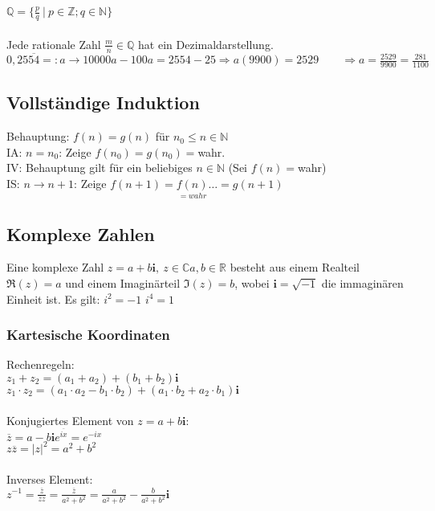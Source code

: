 \documentclass[6pt,a4paper]{scrartcl}
\begin{document}
\begin{multicols}{4}
$\mathbb Q=\{\frac{p}{q}\ \vert\ p\in\mathbb Z; q\in\mathbb N\}$\\
\\
Jede rationale Zahl $\frac m n \in \mathbb Q$ hat ein Dezimaldarstellung.\\
$0,25\overline{54} =: a \rightarrow 10000a - 100a = 2554 -25 \Rightarrow a(9900) = 2529 \qquad \Rightarrow a = \frac{2529}{9900} = \frac{281}{1100}$

\subsection{Vollständige Induktion}
Behauptung: $f(n)=g(n)$ für $n_0 \le n \in \mathbb N$\\ 
IA: $n=n_0$: \quad Zeige $f(n_0)=g(n_0)=$wahr.\\
IV: Behauptung gilt für ein beliebiges $n\in\mathbb N$ \quad (Sei $f(n)=$wahr)\\
IS: $n \rightarrow n+1$: \quad Zeige $f(n+1)=\underset{=wahr}{f(n)}  \dotsc=g(n+1)$

\subsection{Komplexe Zahlen}
Eine komplexe Zahl $z=a+b\mathbf{i},\ z\in \mathbb C a,b \in \mathbb R$ besteht aus einem Realteil $\Re(z)=a$ und einem Imaginärteil $\Im(z)=b$, wobei $\mathbf{i}=\sqrt{-1}$ die immaginären Einheit ist.
Es gilt: \quad $i^2 = -1$ \quad $i^4 = 1$
\subsubsection{Kartesische Koordinaten}
Rechenregeln:\\
$z_1+z_2=(a_1+a_2)+(b_1+b_2)\mathbf{i}$\\
$z_1\cdot z_2=(a_1\cdot a_2-b_1\cdot b_2)+(a_1\cdot b_2+a_2\cdot b_1)\mathbf{i}$\\
\\
Konjugiertes Element von $z=a+b\mathbf{i}$:\\
$\overline{z}=a-b\mathbf{i}$\qquad \qquad \qquad \qquad \qquad \qquad \qquad \qquad $e^{\overline{ix}} = e^{-ix}$  \\
$z\overline{z}=|z|^2=a^2+b^2$\\
\\
Inverses Element:\\
$z^{-1}=\frac{\overline z}{\overline z z}=\frac{\overline z}{a^2+b^2}=\frac{a}{a^2+b^2} - \frac{b}{a^2+b^2}\mathbf{i}$



\end{multicols}
\end{document}
